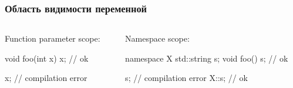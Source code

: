 \documentclass[compress, 8pt]{beamer}
\begin{document}
\begin{frame}[fragile]

    \frametitle{Область видимости переменной}

    \begin{columns}[T]

        \begin{column}{0.5\textwidth}

            Function parameter scope:

            \begin{myinplacelisting}[minted language=cpp]
void foo(int x) {
    x; // ok
}

x; // compilation error
            \end{myinplacelisting}

        \end{column}

        \begin{column}{0.5\textwidth}

            Namespace scope:

            \begin{myinplacelisting}[minted language=cpp]
namespace X {
    std::string s;
    void foo() {
        s; // ok
    }
}

s; // compilation error
X::s; // ok
            \end{myinplacelisting}

        \end{column}

    \end{columns}

\end{frame}
\end{document}
